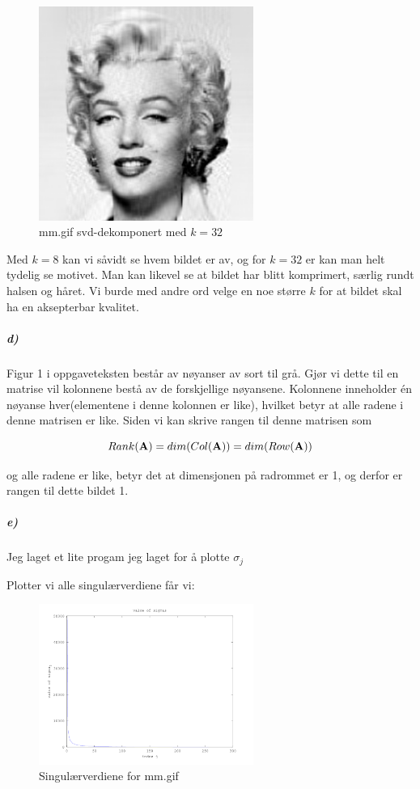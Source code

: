 \documentclass[a4paper,norsk, 10pt]{article}
\begin{document}
\begin{figure}[H]
\begin{center}
\includegraphics[width = 70mm]{k32.png}
\caption{mm.gif svd-dekomponert med $k=32$}
\end{center}
\end{figure}

Med $k = 8$ kan vi såvidt se hvem bildet er av, og for $k=32$ er kan man helt tydelig se motivet. Man kan likevel se at bildet har blitt komprimert, særlig rundt halsen og håret. Vi burde med andre ord velge en noe større $k$ for at bildet skal ha en aksepterbar kvalitet.

\newpage

\subparagraph*{d)}

Figur 1 i oppgaveteksten består av nøyanser av sort til grå. Gjør vi dette til en matrise vil kolonnene bestå av de forskjellige nøyansene. Kolonnene inneholder én nøyanse hver(elementene i denne kolonnen er like), hvilket betyr at alle radene i denne matrisen er like. Siden vi kan skrive rangen til denne matrisen som 

$$Rank(\bold{A}) = dim(Col(\bold{A})) = dim(Row(\bold{A}))$$

og alle radene er like, betyr det at dimensjonen på radrommet er 1, og derfor er rangen til dette bildet 1.

\subparagraph*{e)}

Jeg laget et lite progam jeg laget for å plotte $\sigma_j$



Plotter vi alle singulærverdiene får vi:

\begin{figure}[H]
\begin{center}
\includegraphics[width = 70mm]{sigmas.png}
\caption{Singulærverdiene for mm.gif}
\end{center}
\end{figure}
\end{document}
